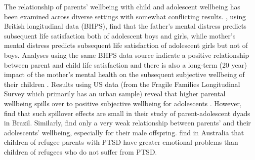 \documentclass[10pt, letterpaper]{article}
\begin{document}
\begin{spacing}{1.4}
The relationship of parents' wellbeing with child and adolescent wellbeing has
been examined across diverse settings with somewhat conflicting
results. \citet{powdthavee2008}, using British longitudinal data (BHPS), find that the
father's mental distress predicts subsequent life satisfaction both of
adolescent boys and girls, while mother's mental distress predicts subsequent
life satisfaction of adolescent girls but not of boys. Analyses using the same
BHPS data source  indicate a positive relationship between parent and child
life satisfaction \citep{clair2012relationship} and there is also a long-term
(20 year) impact of the mother's mental health on the subsequent subjective
wellbeing of their children \citep{layard2014,clark2019}. Results using US data
(from the Fragile Families Longitudinal Survey which primarily has an urban
sample) reveal that higher parental wellbeing spills over to positive subjective
wellbeing for adolescents \citep{coles2022,park2024}.
However, \citet{bedin2014dyadic}  find that such spillover effects are small in
their study of parent-adolescent dyads in Brazil. Similarly,
\citet{casas2008does, casas2012testing}  find only a very weak relationship between parents' and their
adolescents' wellbeing, especially for their male offspring. 
\citet{bryant2018} find in Australia that children of refugee parents with PTSD
have greater emotional problems than children of refugees who do not suffer from
PTSD.


\end{spacing}
\end{document}
